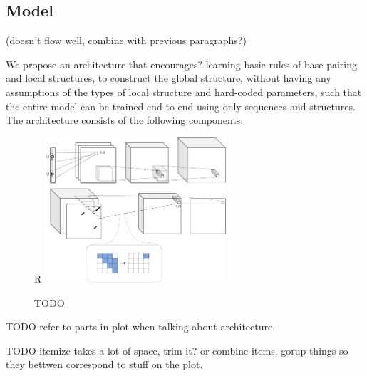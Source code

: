 \documentclass{article}
\begin{document}


\subsection{Model}

(doesn't flow well, combine with previous paragraphs?)

We propose an architecture that encourages? learning
basic rules of base pairing and local structures, to construct the global structure,
without having any assumptions of the types of local structure and hard-coded parameters,
such that the entire model can be trained end-to-end using only sequences and structures.
The architecture consists of the following components:

\begin{figure}{R}
        \centering
        \includegraphics[width=0.6\textwidth]{plot/nn_arch_1.pdf}
        \caption{TODO}
        \label{fig:nn_arch_1}
        \centering
\end{figure}



TODO refer to parts in plot when talking about architecture.

TODO itemize takes a lot of space, trim it? or combine items.
gorup things so they bettwen correspond to stuff on the plot.
\end{document}
